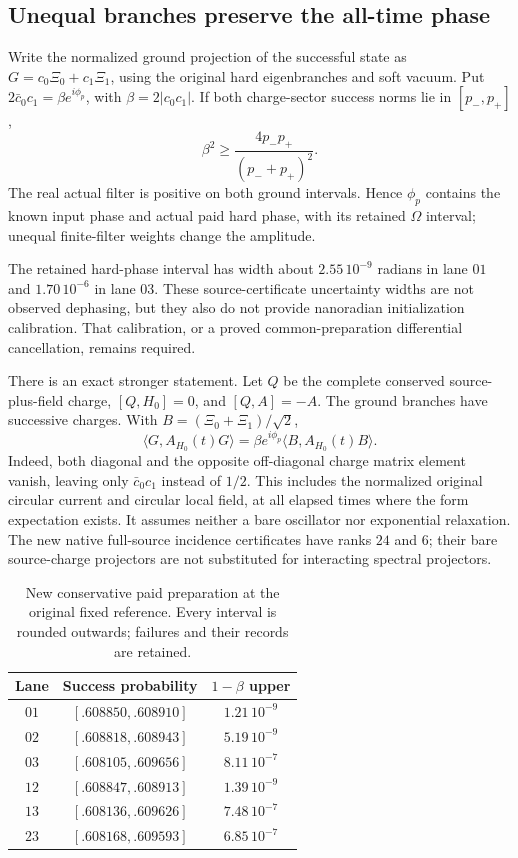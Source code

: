 \subsection{Unequal branches preserve the all-time phase}
Write the normalized ground projection of the successful state as
$G=c_0\Xi_0+c_1\Xi_1$, using the original hard eigenbranches and soft
vacuum. Put $2\bar c_0c_1=\beta e^{i\phi_p}$, with
$\beta=2|c_0c_1|$. If both charge-sector success norms lie in $[p_-,p_+]$,
\begin{equation}
 \beta^2\geq\frac{4p_-p_+}{(p_-+p_+)^2}.
 \label{eq:prep-beta}
\end{equation}
The real actual filter is positive on both ground intervals. Hence
$\phi_p$ contains the known input phase and actual paid hard phase,
with its retained $\Omega$ interval; unequal finite-filter weights change
the amplitude.

The retained hard-phase interval has width about $2.55\,10^{-9}$ radians
in lane $01$ and $1.70\,10^{-6}$ in lane $03$. These source-certificate
uncertainty widths are not observed dephasing, but they also do not provide
nanoradian initialization calibration. That calibration, or a proved
common-preparation differential cancellation, remains required.

There is an exact stronger statement. Let $Q$ be the complete conserved
source-plus-field charge, $[Q,H_0]=0$, and $[Q,A]=-A$. The ground branches
have successive charges. With $B=(\Xi_0+\Xi_1)/\sqrt2$,
\begin{equation}
 \langle G,A_{H_0}(t)G\rangle
 =\beta e^{i\phi_p}\langle B,A_{H_0}(t)B\rangle .
 \label{eq:prep-charge-alltime}
\end{equation}
Indeed, both diagonal and the opposite off-diagonal charge matrix element
vanish, leaving only $\bar c_0c_1$ instead of $1/2$.
This includes the normalized original circular current and circular local
field, at all elapsed times where the form expectation exists. It assumes
neither a bare oscillator nor exponential relaxation. The new native
full-source incidence certificates have ranks $24$ and $6$; their bare
source-charge projectors are not substituted for interacting spectral
projectors.

\begin{table}[t]
\centering\small
\caption{New conservative paid preparation at the original fixed reference.
Every interval is rounded outwards; failures and their records are retained.}
\begin{tabular}{c c c}
\hline
Lane & Success probability & $1-\beta$ upper \\\hline
$01$ & $[.608850,.608910]$ & $1.21\,10^{-9}$\\
$02$ & $[.608818,.608943]$ & $5.19\,10^{-9}$\\
$03$ & $[.608105,.609656]$ & $8.11\,10^{-7}$\\
$12$ & $[.608847,.608913]$ & $1.39\,10^{-9}$\\
$13$ & $[.608136,.609626]$ & $7.48\,10^{-7}$\\
$23$ & $[.608168,.609593]$ & $6.85\,10^{-7}$\\\hline
\end{tabular}
\end{table}

